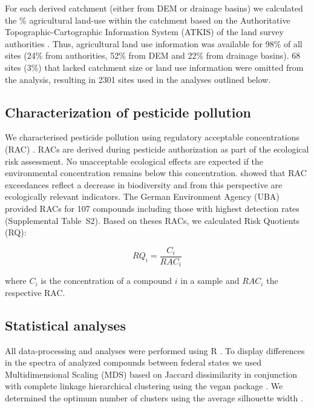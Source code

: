 \documentclass[journal=esthag,manuscript=article]{achemso}
\begin{document}
For each derived catchment (either from DEM or drainage basins) we calculated the \% agricultural land-use within the catchment based on the Authoritative Topographic-Cartographic Information System (ATKIS) of the land survey authorities \citep{adv_atkis_2016}. 
Thus, agricultural land use information was available for 98\% of all sites (24\% from authorities, 52\% from DEM and 22\% from drainage basins). 
68 sites (3\%) that lacked catchment size or land use information were omitted from the analysis, resulting in 2301 sites used in the analyses outlined below.



\subsection{Characterization of pesticide pollution}
We characterised pesticide pollution using regulatory acceptable concentrations (RAC) \citep{brock_linking_2010}.
RACs are derived during pesticide authorization as part of the ecological risk assessment.
No unacceptable ecological effects are expected if the environmental concentration remains below this concentration.
\citet{stehle_pesticide_2015} showed that RAC exceedances reflect a decrease in biodiversity and from this perspective are ecologically relevant indicators. 
The German Environment Agency (UBA) provided RACs for 107 compounds including those with highest detection rates (Supplemental Table~S2). 
Based on theses RACs, we calculated Risk Quotients (RQ):

\begin{equation}
RQ_i = \frac{C_i}{RAC_i}
\end{equation}

where $C_i$ is the concentration of a compound $i$ in a sample and $RAC_i$ the respective RAC.


\subsection{Statistical analyses}
All data-processing and analyses were performed using R \citep{r_core_team_r:_2016}.
To display differences in the spectra of analyzed compounds between federal states we used Multidimensional Scaling (MDS) based on Jaccard dissimilarity in conjunction with complete linkage hierarchical clustering using the vegan package \citep{oksanen_vegan:_2016}.
We determined the optimum number of clusters using the average silhouette width \citep{rousseeuw1987silhouettes}. 
\end{document}
